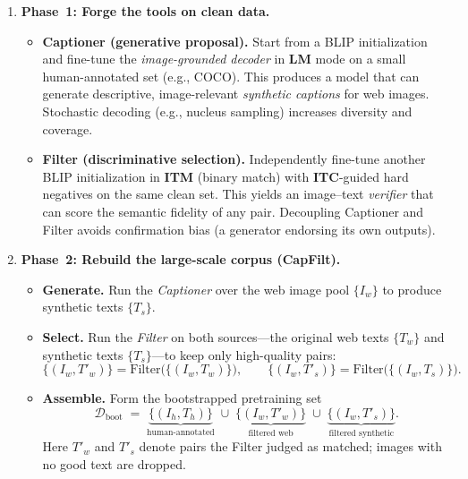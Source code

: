 \begin{enrichment}
\begin{enrichment}
        \begin{enumerate}
            \item \textbf{Phase~1: Forge the tools on clean data.}
            \begin{itemize}
                \item \textbf{Captioner (generative proposal).} Start from a BLIP initialization and fine-tune the \emph{image-grounded decoder} in \textbf{LM} mode on a small human-annotated set (e.g., COCO). This produces a model that can generate descriptive, image-relevant \emph{synthetic captions} for web images. Stochastic decoding (e.g., nucleus sampling) increases diversity and coverage.
                \item \textbf{Filter (discriminative selection).} Independently fine-tune another BLIP initialization in \textbf{ITM} (binary match) with \textbf{ITC}-guided hard negatives on the same clean set. This yields an image–text \emph{verifier} that can score the semantic fidelity of any pair. Decoupling Captioner and Filter avoids confirmation bias (a generator endorsing its own outputs).
            \end{itemize}
            
            \item \textbf{Phase~2: Rebuild the large-scale corpus (CapFilt).}
            \begin{itemize}
                \item \textbf{Generate.} Run the \emph{Captioner} over the web image pool $\{I_w\}$ to produce synthetic texts $\{T_s\}$.
                \item \textbf{Select.} Run the \emph{Filter} on both sources—the original web texts $\{T_w\}$ and synthetic texts $\{T_s\}$—to keep only high-quality pairs:
                \[
                \{(I_w, T'_w)\} = \mathrm{Filter}\big(\{(I_w, T_w)\}\big), \qquad
                \{(I_w, T'_s)\} = \mathrm{Filter}\big(\{(I_w, T_s)\}\big).
                \]
                \item \textbf{Assemble.} Form the bootstrapped pretraining set
                \[
                \mathcal{D}_{\mathrm{boot}} \;=\; \underbrace{\{(I_h, T_h)\}}_{\text{human-annotated}}
                \;\cup\; \underbrace{\{(I_w, T'_w)\}}_{\text{filtered web}}
                \;\cup\; \underbrace{\{(I_w, T'_s)\}}_{\text{filtered synthetic}}.
                \]
                Here $T'_w$ and $T'_s$ denote pairs the Filter judged as matched; images with no good text are dropped.
            \end{itemize}
            

\end{enumerate}
\end{enrichment}
\end{enrichment}

